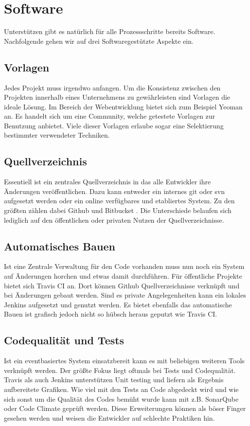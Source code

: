 \chapter{Software}
Unterstützen gibt es natürlich für alle Prozessschritte bereits Software. Nachfolgende gehen wir auf drei Softwaregestützte Aspekte ein.

\section{Vorlagen}
Jedes Projekt muss irgendwo anfangen. Um die Konsistenz zwischen den Projekten innerhalb eines Unternehmens zu gewährleisten sind Vorlagen die ideale Lösung. Im Bereich der Webentwicklung bietet sich zum Beispiel Yeoman \cite{yeoman} an. Es handelt sich um eine Community, welche getestete Vorlagen zur Benutzung anbietet. Viele dieser Vorlagen erlaube sogar eine Selektierung bestimmter verwendeter Techniken.

\section{Quellverzeichnis}
Essentiell ist ein zentrales Quellverzeichnis in das alle Entwickler ihre Änderungen veröffentlichen. Dazu kann entweder ein internes git oder svn aufgesetzt werden oder ein online verfügbares und etabliertes System. Zu den größten zählen dabei Github \cite{github} und Bitbucket \cite{bitbucket}. Die Unterschiede belaufen sich lediglich auf den öffentlichen oder privaten Nutzen der Quellverzeichnisse.

\section{Automatisches Bauen}
Ist eine Zentrale Verwaltung für den Code vorhanden muss nun noch ein System auf Änderungen horchen und etwas damit durchführen. Für öffentliche Projekte bietet sich Travis CI \cite{travisci} an. Dort können Github Quellverzeichnisse verknüpft und bei Änderungen gebaut werden. Sind es private Angelegenheiten kann ein lokales Jenkins \cite{jenkins} aufgesetzt und genutzt werden. Es bietet ebenfalls das automatische Bauen ist grafisch jedoch nicht so hübsch heraus geputzt wie Travis CI.

\section{Codequalität und Tests}
Ist ein eventbasiertes System einsatzbereit kann es mit beliebigen weiteren Tools verknüpft werden. Der größte Fokus liegt oftmals bei Tests und Codequalität. Travis als auch Jenkins unterstützen Unit testing und liefern als Ergebnis aufbereitete Grafiken. Wie viel mit den Tests an Code abgedeckt wird und wie sich sonst um die Qualität des Codes bemüht wurde kann mit z.B. SonarQube \cite{sonarqube} oder Code Climate \cite{code-climate} geprüft werden. Diese Erweiterungen können als böser Finger gesehen werden und weisen die Entwickler auf schlechte Praktiken hin.